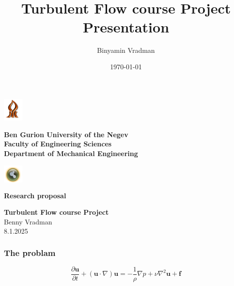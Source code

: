 \documentclass{beamer}
\title[Turbulent Flow Project]{Turbulent Flow course Project Presentation}
\author[Benny]{Binyamin Vradman}
\institute{Ben Gurion University of the Negev}
\date{\today}
\begin{document}
\begin{frame}

\thispagestyle{empty}
\setlength{\parindent}{0pt}

\noindent
\includegraphics[width=1cm]{Picture1.png}%
\hfill
\begin{minipage}[c]{0.75\textwidth}
  \centering
  {\bfseries \large Ben Gurion University of the Negev}\\
\vspace{0.3cm}  
{\bfseries Faculty of Engineering Sciences}\\
\vspace{0.3cm}
{\bfseries\large Department of Mechanical Engineering}
\end{minipage}
\hfill
\includegraphics[width=1cm]{Picture2.png}

\vspace{1cm}

\begin{center}
    { \bfseries Research proposal}\\
\end{center}

\vspace{0.3cm}

\begin{center}
    { \bfseries\large Turbulent Flow course Project}\\
\vspace{0.5cm}
{ Benny Vradman}\\
\vspace{0.2cm}
{8.1.2025}
\end{center}

\end{frame}
\setcounter{page}{1}
\begin{frame}
\frametitle{The problam}
\begin{equation}
  \frac{\partial \mathbf{u}}{\partial t} + (\mathbf{u} \cdot \nabla)
   \mathbf{u} = -\frac{1}{\rho} \nabla p + \nu \nabla^2 \mathbf{u} + \mathbf{f}
  \end{equation}
\end{frame}
\end{document}
